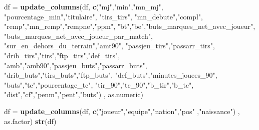 \documentclass[7pt,]{report}
\newenvironment{Shaded}{\begin{snugshade}}{\end{snugshade}}
\newcommand{\KeywordTok}[1]{\textcolor[rgb]{0.13,0.29,0.53}{\textbf{#1}}}
\newcommand{\NormalTok}[1]{#1}
\newcommand{\StringTok}[1]{\textcolor[rgb]{0.31,0.60,0.02}{#1}}
\begin{document}
\begin{Shaded}
\begin{Highlighting}[]
\NormalTok{df =}\StringTok{ }\KeywordTok{update_columns}\NormalTok{(df, }
                    \KeywordTok{c}\NormalTok{(}\StringTok{"mj"}\NormalTok{,}\StringTok{"min"}\NormalTok{,}\StringTok{"mn_mj"}\NormalTok{,}
                      \StringTok{"pourcentage_min"}\NormalTok{,}\StringTok{"titulaire"}\NormalTok{,}
                      \StringTok{"tirs_tirs"}\NormalTok{, }\StringTok{"mn_debute"}\NormalTok{,}\StringTok{"compl"}\NormalTok{,}
                      \StringTok{"remp"}\NormalTok{,}\StringTok{"mn_remp"}\NormalTok{,}\StringTok{"rempne"}\NormalTok{,}\StringTok{"ppm"}\NormalTok{,}
                      \StringTok{"bt"}\NormalTok{,}\StringTok{"be"}\NormalTok{,}\StringTok{"buts_marques_net_avec_joueur"}\NormalTok{,}
                      \StringTok{"buts_marques_net_avec_joueur_par_match"}\NormalTok{,}
                      \StringTok{"sur_en_dehors_du_terrain"}\NormalTok{,}\StringTok{"amt90"}\NormalTok{,}
                      \StringTok{"passjeu_tirs"}\NormalTok{,}\StringTok{"passarr_tirs"}\NormalTok{,}
                      \StringTok{"drib_tirs"}\NormalTok{,}\StringTok{"tirs"}\NormalTok{,}\StringTok{"ftp_tirs"}\NormalTok{,}\StringTok{"def_tirs"}\NormalTok{,}
                      \StringTok{"amb"}\NormalTok{,}\StringTok{"amb90"}\NormalTok{,}\StringTok{"passjeu_buts"}\NormalTok{,}\StringTok{"passarr_buts"}\NormalTok{,}
                      \StringTok{"drib_buts"}\NormalTok{,}\StringTok{"tirs_buts"}\NormalTok{,}\StringTok{"ftp_buts"}\NormalTok{,}
                      \StringTok{"def_buts"}\NormalTok{,}\StringTok{"minutes_jouees_90"}\NormalTok{,}
                      \StringTok{"buts"}\NormalTok{,}\StringTok{"tc"}\NormalTok{,}\StringTok{"pourcentage_tc"}\NormalTok{,}
                      \StringTok{"tir_90"}\NormalTok{,}\StringTok{"tc_90"}\NormalTok{,}\StringTok{"b_tir"}\NormalTok{,}\StringTok{"b_tc"}\NormalTok{,}
                      \StringTok{"dist"}\NormalTok{,}\StringTok{"cf"}\NormalTok{,}\StringTok{"penm"}\NormalTok{,}\StringTok{"pent"}\NormalTok{,}\StringTok{"buts"}\NormalTok{)}
\NormalTok{                    , as.numeric)}

\NormalTok{df =}\StringTok{ }\KeywordTok{update_columns}\NormalTok{(df, }\KeywordTok{c}\NormalTok{(}\StringTok{"joueur"}\NormalTok{,}\StringTok{"equipe"}\NormalTok{,}\StringTok{"nation"}\NormalTok{,}\StringTok{"pos"}
\NormalTok{                          ,}\StringTok{"naissance"}\NormalTok{)}
\NormalTok{                    , as.factor)}
\KeywordTok{str}\NormalTok{(df)}
\end{Highlighting}
\end{Shaded}
\end{document}
